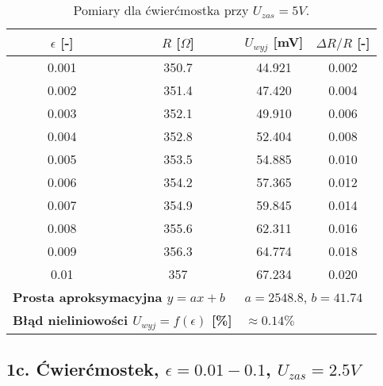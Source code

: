 \documentclass[12pt, a4paper]{article}
\begin{document}
	\begin{table}[H]
		\centering
		\caption{Pomiary dla ćwierćmostka przy $U_{zas} = 5 V$.}
		\begin{tabular}{cccc}
			\toprule
			$\epsilon$ [-] & $R$ [$\Omega$] & $U_{wyj}$ [mV] & $\Delta R/R$ [-] \\
			\midrule
			0.001 & 350.7 & 44.921 & 0.002 \\
			0.002 & 351.4 & 47.420 & 0.004 \\
			0.003 & 352.1 & 49.910 & 0.006 \\
			0.004 & 352.8 & 52.404 & 0.008 \\
			0.005 & 353.5 & 54.885 & 0.010 \\
			0.006 & 354.2 & 57.365 & 0.012 \\
			0.007 & 354.9 & 59.845 & 0.014 \\
			0.008 & 355.6 & 62.311 & 0.016 \\
			0.009 & 356.3 & 64.774 & 0.018 \\
			0.01 & 357 & 67.234 & 0.020 \\
			\midrule
			\multicolumn{2}{l}{\textbf{Prosta aproksymacyjna $y = ax + b$}} & \multicolumn{2}{l}{$a = 2548.8$, $b = 41.74$} \\
			\multicolumn{2}{l}{\textbf{Błąd nieliniowości $U_{wyj} = f(\epsilon)$ [\%]}} & \multicolumn{2}{l}{$\approx 0.14 \%$} \\
			\bottomrule
		\end{tabular}
	\end{table}
	
	\subsection{1c. Ćwierćmostek, $\epsilon = 0.01-0.1$, $U_{zas} = 2.5 V$}
	
\end{document}
